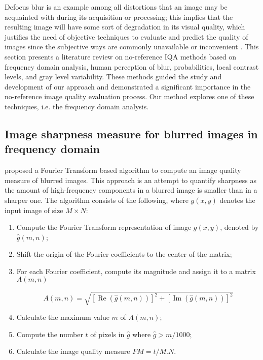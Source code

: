 Defocus blur is an example among all distortions that an image may be acquainted with during its acquisition or processing; this implies that the resulting image will have some sort of degradation in its visual quality, which justifies the need of objective techniques to evaluate and predict the quality of images since the subjective ways are commonly unavailable or inconvenient \cite{wang2004image}. This section presents a literature review on no-reference IQA methods based on frequency domain analysis, human perception of blur, probabilities, local contrast levels, and gray level variability. These methods guided the study and development of our approach and demonstrated a significant importance in the no-reference image quality evaluation process. Our method explores one of these techniques, i.e. the frequency domain analysis.

\subsection{Image sharpness measure for blurred images in frequency domain}

 proposed a Fourier Transform based algorithm to compute an image quality measure of blurred images. This approach is an attempt to quantify sharpness as the amount of high-frequency components in a blurred image is smaller than in a sharper one. The algorithm consists of the following, where $g(x,y)$ denotes the input image of size $M \times N$:

\begin{enumerate}[label=\Roman* -]
    \item Compute the Fourier Transform representation of image $g(x,y)$, denoted by $\hat{g}(m,n)$;
    
    \item Shift the origin of the Fourier coefficients to the center of the matrix;
    
    \item For each Fourier coefficient, compute its magnitude and assign it to a matrix $A(m,n)$
    
    \begin{equation*}
        A(m,n) = \sqrt{
            [\operatorname{Re}{(\hat{g}(m,n))}]^{2}
            + [\operatorname{Im}{(\hat{g}(m,n))}]^{2}
          }
    \end{equation*}
    
    \item  Calculate the maximum value $m$ of $A(m,n)$; 
    
    \item Compute the number $t$ of pixels in $\hat{g}$ where $\hat{g} > m /1000$;
    
    \item Calculate the image quality measure $FM = t /M.N$.
\end{enumerate}

